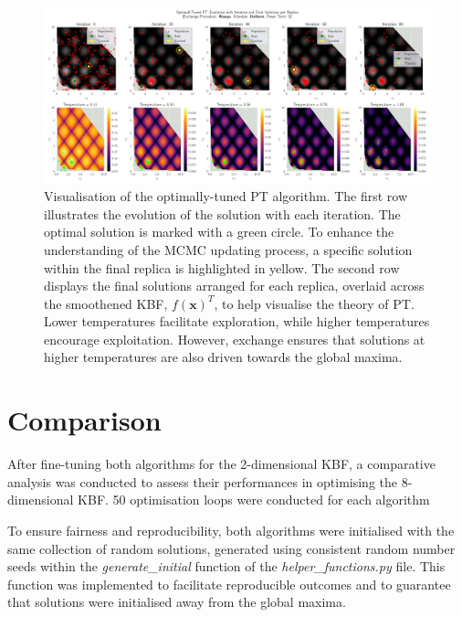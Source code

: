 \documentclass[10pt]{article}
\begin{document}
\begin{figure}[H]
    \centering
    \includegraphics[width=1.1\textwidth]{../figures/Permanent Images/PT_Optimal_Tuning.png}
    \captionsetup{justification=centering}
    \caption{Visualisation of the optimally-tuned PT algorithm. The first row illustrates the evolution of the solution with each iteration. The optimal solution is marked with a green circle. To enhance the understanding of the MCMC updating process, a specific solution within the final replica is highlighted in yellow. The second row displays the final solutions arranged for each replica, overlaid across the smoothened KBF, $f(\mathbf{x})^T$, to help visualise the theory of PT. Lower temperatures facilitate exploration, while higher temperatures encourage exploitation. However, exchange ensures that solutions at higher temperatures are also driven towards the global maxima.}
    \label{fig:PToptimal_evo}
\end{figure}

\section{Comparison}
\label{sec:CGA_QEG_comparison}

After fine-tuning both algorithms for the 2-dimensional KBF, a comparative analysis was conducted to assess their performances in optimising the 8-dimensional KBF. 50 optimisation loops were conducted for each algorithm

To ensure fairness and reproducibility, both algorithms were initialised with the same collection of random solutions, generated using consistent random number seeds within the \textit{generate\_initial} function of the \textit{helper\_functions.py} file. This function was implemented to facilitate reproducible outcomes and to guarantee that solutions were initialised away from the global maxima.


\newpage
\end{document}

